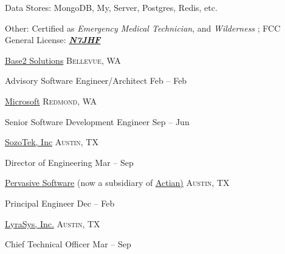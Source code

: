 \documentclass[10pt,letterpaper]{article}
\begin{document}
\vspace{0.5em}\inlineheadsection
{Data Stores:}
{MongoDB,  My,   Server, Postgres, Redis, etc.}

\vspace{0.5em}\inlineheadsection
{Other:}
{Certified as \emph{Emergency Medical Technician}, and \emph{Wilderness }; {FCC General License: {\href{https://wireless2.fcc.gov/UlsApp/UlsSearch/license.jsp?licKey=3095481}{ \emph{\textbf{N7JHF}}}}}}

\vspace{1em}\spacedhrule{0.5em}{-0.4em}


	\headedsection
	{\href{https://base2s.com/}{Base2 Solutions}}
	{\textsc{Bellevue, WA}} {%
		
		\headedsubsection
		{Advisory Software Engineer/Architect}
		{Feb  -- Feb }
		{}	
	}
	
	\vspace*{1em}

	\headedsection
	{\href{https://www.microsoft.com/en-us/}{Microsoft}}
	{\textsc{Redmond, WA}} {%
	
		\headedsubsection
		{Senior Software Development Engineer}
		{Sep  -- Jun }
		{}	
	}
		
	\vspace*{1em}
	
	\headedsection
	{\href{http://www.zoominfo.com/c/SozoTek-Inc/53446018}{SozoTek, Inc}}
	{\textsc{Austin, TX}} {%
		
		\headedsubsection
		{Director of Engineering}
		{Mar  -- Sep }
			
	}

	\vspace*{1em}
	\headedsection
	{\href{http://www.pervasive.com/}{Pervasive Software} (now a subsidiary of \href{https://www.actian.com/}{Actian)}}
	{\textsc{Austin, TX}} {%
				
		\headedsubsection
		{Principal Engineer}
		{Dec  -- Feb }

	}
					
	\vspace*{1em}
	\headedsection
	{\href{http://lyrasys.com}{LyraSys, Inc.}}
	{\textsc{Austin, TX}} {%
						
		\headedsubsection
		{Chief Technical Officer}
		{Mar  -- Sep }

	}
						
\end{document}
